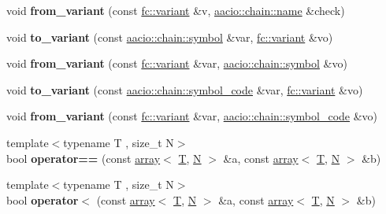 \begin{DoxyCompactItemize}
\item 
\mbox{\label{namespacefc_a167de2497d0a0dde4b629ee4dba7299c}} 
void {\bfseries from\+\_\+variant} (const \mbox{\hyperlink{classfc_1_1variant}{fc\+::variant}} \&v, \mbox{\hyperlink{structaacio_1_1chain_1_1name}{aacio\+::chain\+::name}} \&check)
\item 
\mbox{\label{namespacefc_a61ef999e642f889cc0ed1532a25985c2}} 
void {\bfseries to\+\_\+variant} (const \mbox{\hyperlink{classaacio_1_1chain_1_1symbol}{aacio\+::chain\+::symbol}} \&var, \mbox{\hyperlink{classfc_1_1variant}{fc\+::variant}} \&vo)
\item 
\mbox{\label{namespacefc_a0439831cb2a57920f748a8e62e4dee06}} 
void {\bfseries from\+\_\+variant} (const \mbox{\hyperlink{classfc_1_1variant}{fc\+::variant}} \&var, \mbox{\hyperlink{classaacio_1_1chain_1_1symbol}{aacio\+::chain\+::symbol}} \&vo)
\item 
\mbox{\label{namespacefc_a25de1fe6de0cdc6c13c5735de836eb8d}} 
void {\bfseries to\+\_\+variant} (const \mbox{\hyperlink{structaacio_1_1chain_1_1symbol__code}{aacio\+::chain\+::symbol\+\_\+code}} \&var, \mbox{\hyperlink{classfc_1_1variant}{fc\+::variant}} \&vo)
\item 
\mbox{\label{namespacefc_aedfcbf337d0cad1ae207057187af3a8e}} 
void {\bfseries from\+\_\+variant} (const \mbox{\hyperlink{classfc_1_1variant}{fc\+::variant}} \&var, \mbox{\hyperlink{structaacio_1_1chain_1_1symbol__code}{aacio\+::chain\+::symbol\+\_\+code}} \&vo)
\item 
\mbox{\label{namespacefc_a71ac088ff7dcef9686fc7560942e38d0}} 
{\footnotesize template$<$typename T , size\+\_\+t N$>$ }\\bool {\bfseries operator==} (const \mbox{\hyperlink{classfc_1_1array}{array}}$<$ \mbox{\hyperlink{struct_t}{T}}, \mbox{\hyperlink{group__types_gaf9c1edb0e0da55ec6ba09f32f6839529}{N}} $>$ \&a, const \mbox{\hyperlink{classfc_1_1array}{array}}$<$ \mbox{\hyperlink{struct_t}{T}}, \mbox{\hyperlink{group__types_gaf9c1edb0e0da55ec6ba09f32f6839529}{N}} $>$ \&b)
\item 
\mbox{\label{namespacefc_a124b75eba5b23ec0df0cfdd00ae8757b}} 
{\footnotesize template$<$typename T , size\+\_\+t N$>$ }\\bool {\bfseries operator$<$} (const \mbox{\hyperlink{classfc_1_1array}{array}}$<$ \mbox{\hyperlink{struct_t}{T}}, \mbox{\hyperlink{group__types_gaf9c1edb0e0da55ec6ba09f32f6839529}{N}} $>$ \&a, const \mbox{\hyperlink{classfc_1_1array}{array}}$<$ \mbox{\hyperlink{struct_t}{T}}, \mbox{\hyperlink{group__types_gaf9c1edb0e0da55ec6ba09f32f6839529}{N}} $>$ \&b)

\end{DoxyCompactItemize}
